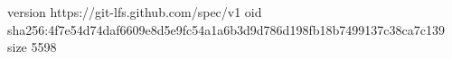 version https://git-lfs.github.com/spec/v1
oid sha256:4f7e54d74daf6609e8d5e9fc54a1a6b3d9d786d198fb18b7499137c38ca7c139
size 5598
